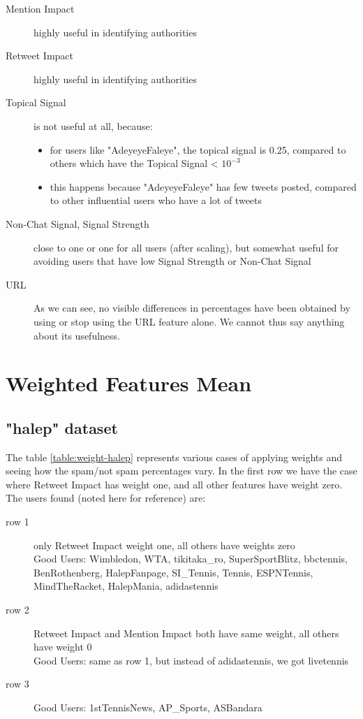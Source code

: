 \begin{description}
	\item[Mention Impact] highly useful in identifying authorities
    \item[Retweet Impact] highly useful in identifying authorities
    \item[Topical Signal] is not useful at all, because:
    \begin{itemize}
    	\item for users like "AdeyeyeFaleye", the topical signal is 0.25, compared to others which have the Topical Signal < $10^{-3}$
        \item this happens because "AdeyeyeFaleye" has few tweets posted, compared to other influential users who have a lot of tweets
    \end{itemize}
    \item[Non-Chat Signal, Signal Strength] close to one or one for all users (after scaling), but somewhat useful for avoiding users that have low Signal Strength or Non-Chat Signal
    \item[URL] As we can see, no visible differences in percentages have been obtained by using or stop using the URL feature alone. We cannot thus say anything about its usefulness.
\end{description}

\section{Weighted Features Mean}

\subsection{"halep" dataset}

The table \ref{table:weight-halep} represents various cases of applying weights and seeing how the spam/not spam percentages vary. In the first row we have the case where Retweet Impact has weight one, and all other features have weight zero.
The users found (noted here for reference) are:
\begin{description}
	\item[row 1] only Retweet Impact weight one, all others have weights zero\\
    Good Users: Wimbledon, WTA, tikitaka\_ro, SuperSportBlitz, bbctennis, BenRothenberg, HalepFanpage, SI\_Tennis, Tennis, ESPNTennis, MindTheRacket, HalepMania, adidastennis
    \item[row 2] Retweet Impact and Mention Impact both have same weight, all others have weight 0\\
    Good Users: same as row 1, but instead of adidastennis, we got livetennis
    \item[row 3]
    Good Users: 1stTennisNews, AP\_Sports, ASBandara
\end{description}


